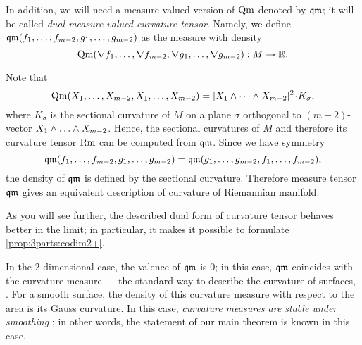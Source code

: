 In addition, we will need a measure-valued version of $\operatorname{\rm Qm}$ denoted by $\operatorname{\mathfrak{qm}}$;
it will be called \emph{dual measure-valued curvature tensor}.
Namely, we define $\qm(f_1,\zz\dots,f_{m-2},g_1,\zz\dots,g_{m-2})$ as the measure with density
\[\operatorname{\rm Qm}(\nabla f_1,\dots,\nabla f_{m-2},\nabla g_1,\dots,\nabla g_{m-2}): M\to\mathbb{R}.\]

Note that 
$$\Qm(X_1,\dots,X_{m-2},X_1,\dots,X_{m-2})
=
|X_1\wedge\dots \wedge X_{m-2}|^2\cdot K_\sigma, $$
where $K_\sigma$ is the sectional curvature of $M$ 
on a plane $\sigma$ orthogonal to $(m-2)$-vector
$X_1\wedge\zz\dots \wedge X_{m-2}$.
Hence, the sectional curvatures of $M$ and therefore its curvature tensor $\operatorname{\rm Rm}$ can  be computed from
$\operatorname{\mathfrak{qm}}$.
Since we have symmetry
$$\operatorname{\mathfrak{qm}}(f_1,\dots,f_{m-2},g_1,\dots,g_{m-2})=
\operatorname{\mathfrak{qm}}(g_1,\dots,g_{m-2},f_1,\dots,f_{m-2}),$$
the density of $\operatorname{\mathfrak{qm}}$ is defined by the sectional curvature.
Therefore measure tensor $\operatorname{\mathfrak{qm}}$
gives an equivalent description of curvature of Riemannian manifold.

As you will see further, the described dual form of curvature tensor behaves better in the limit;
in particular, it makes it possible to formulate \ref{prop:3parts:codim2+}.

In the 2-dimensional case, the valence of $\operatorname{\mathfrak{qm}}$ is $0$;
in this case, $\operatorname{\mathfrak{qm}}$ coincides with the curvature measure --- the standard way to describe the curvature of surfaces, 
\cite{Resh,AZ}.
For a smooth surface, the density of this curvature measure with respect to the area
is its Gauss curvature.
In this case, \emph{curvature measures are stable under smoothing} \cite[VII \S13]{AZ};
in other words, the statement of our main theorem is known in this case.

